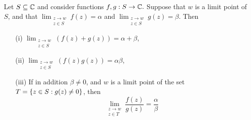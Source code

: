  
 \begin{comment}
This motivates our precise definition of a limit



\begin{example}
\begin{itemize}
Let $f(z)=z^3$ and $w=1+i$.
 
\end{itemize}
\end{example}

Note: it is not so clear how to adapt the definition of a limit to the case where the domain of $f$ is a proper subset of $\C$.  In order to do this, we will need to restrict our attention to a particular type of subset of $\C$ called an open set.

\begin{definition}[Limit of a function at a point of its domain]
Let $U \subseteq \C$ be an open set and $f: U \to \C$ a function defined on $U$.  For a point $w \in U$ we say that $\lim_{z \to w} f(z) = L$ if given any $\epsilon >0$ there is some $\delta >0$ such that for all $z \in U$ satisfying $\abs{z-w} < \delta$ we have $\abs{f(z)-L}< \epsilon$.
\end{definition}
We will need to generalise this definition slightly later on to allow for the case of $\lim_{z \to w} f(z)$ at a point $w \not\in \mathrm{dom} (f)$.  For example, we do not yet know how to calculate something like
\[
\lim_{z \to 0} \frac{\sin (z)}{z}
\]
(if it exists).
\end{comment}


\begin{proposition} 
\label{p:alglimits}
Let $S\subseteq \mathbb{C}$ and consider functions $f,g:S \to \mathbb{C}.$  Suppose that $w$ is a limit point of $S$, and that $\displaystyle \lim_{\substack{z \to w \\ z \in S}} f(z) = \alpha$ and $\displaystyle \lim_{\substack{z \to w \\ z \in S}} g(z)= \beta$.  Then
\begin{enumerate}
\item[(i)] $\displaystyle \lim_{\substack{z \to w \\ z \in S}} \left( f(z) + g(z) \right) = \alpha + \beta$,
\item[(ii)] $\displaystyle \lim_{\substack{z \to w \\ z \in S}} \left( f(z)g(z) \right) = \alpha  \beta$,
\item[(iii)] If in addition $\beta \neq 0$, and $w$ is a limit point of the set $T=\left\{ z \in S: g(z) \neq 0 \right\}$, then
\[
\lim_{ \substack{z \to w \\ z \in T}} \frac{f(z)}{g(z)} = \frac{\alpha}{\beta}
\]
\end{enumerate}
\end{proposition}

